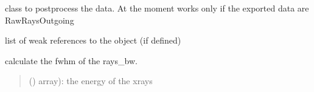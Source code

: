 \documentclass[letterpaper,10pt,english]{sphinxmanual}
\begin{document}
\begin{fulllineitems}
\label{\detokenize{index:raypyng.postprocessing.PostProcess}}
\pysigstartsignatures
{}
\pysigstopsignatures
\sphinxAtStartPar
class to post\sphinxhyphen{}process the data.
At the moment works only if the exported data are RawRaysOutgoing

\begin{fulllineitems}
\label{\detokenize{index:raypyng.postprocessing.PostProcess.__init__}}
\pysigstartsignatures
{}
\pysigstopsignatures
\end{fulllineitems}


\begin{fulllineitems}
\label{\detokenize{index:raypyng.postprocessing.PostProcess.__weakref__}}
\pysigstartsignatures
{}
\pysigstopsignatures
\sphinxAtStartPar
list of weak references to the object (if defined)

\end{fulllineitems}


\begin{fulllineitems}
\label{\detokenize{index:raypyng.postprocessing.PostProcess._extract_bandwidth_fwhm}}
\pysigstartsignatures
{}
\pysigstopsignatures
\sphinxAtStartPar
calculate the fwhm of the rays\_bw.
\begin{quote}\begin{description}
\sphinxAtStartPar
\sphinxstyleliteralstrong{\sphinxupquote{(}} () \textendash{} array): the energy of the x\sphinxhyphen{}rays


\end{description}
\end{quote}
\end{fulllineitems}
\end{fulllineitems}
\end{document}
